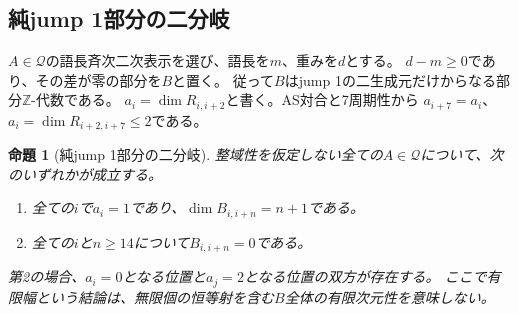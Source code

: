\documentclass[11pt,a4paper]{ltjsarticle}
\newtheorem{proposition}[theorem]{命題}
\theoremstyle{definition}
\begin{document}
\subsection{純jump 1部分の二分岐}
\label{idx:sec:degree-one-dichotomy}

$A\in\mathcal Q$の語長斉次二次表示を選び、語長を$m$、重みを$d$とする。
$d-m\geq0$であり、その差が零の部分を$B$と置く。
従って$B$はjump 1の二生成元だけからなる部分$\mathbb Z$-代数である。
$a_i=\dim R_{i,i+2}$と書く。AS対合と7周期性から
$a_{i+7}=a_i$、$a_i=\dim R_{i+2,i+7}\leq2$である。

\begin{proposition}[純jump 1部分の二分岐]\label{idx:prop:degree-one-dichotomy}
整域性を仮定しない全ての$A\in\mathcal Q$について、次のいずれかが成立する。
\begin{enumerate}
\item 全ての$i$で$a_i=1$であり、$\dim B_{i,i+n}=n+1$である。
\item 全ての$i$と$n\geq14$について$B_{i,i+n}=0$である。
\end{enumerate}
第2の場合、$a_i=0$となる位置と$a_j=2$となる位置の双方が存在する。
ここで有限幅という結論は、無限個の恒等射を含む$B$全体の有限次元性を意味しない。
\end{proposition}
\end{document}

